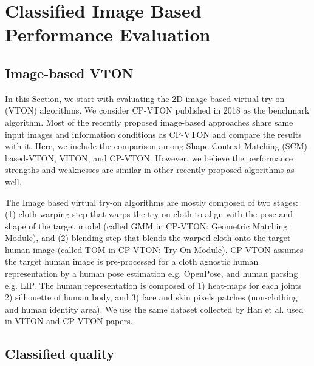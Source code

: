 \section{Classified Image Based Performance Evaluation}

\subsection{Image-based VTON}

In this Section, we start with evaluating the 2D image-based virtual try-on (VTON) algorithms. We consider CP-VTON\cite{Wang2018TowardCI} published in 2018 as the benchmark algorithm. Most of the recently proposed image-based approaches\cite{Han2017VITONAI,Sun2019ImageBasedVT,Yu_2019_ICCV} share same input images and information conditions as CP-VTON and compare the results with it. Here, we include the comparison among Shape-Context Matching (SCM) based-VTON, VITON\cite{Han2017VITONAI}, and  CP-VTON\cite{Wang2018TowardCI}. However, we believe the performance strengths and weaknesses are similar in other recently proposed algorithms as well.


The Image based virtual try-on algorithms are mostly composed of two stages: (1) cloth warping step that warps the try-on cloth to align with the pose and shape of the target model (called GMM in CP-VTON: Geometric Matching Module)\cite{Wang2018TowardCI}, and (2) blending step that blends the warped cloth onto the target human image (called TOM in CP-VTON: Try-On Module)\cite{Wang2018TowardCI}. CP-VTON\cite{Wang2018TowardCI} assumes the target human image is pre-processed for a cloth agnostic human representation by a human pose estimation e.g. OpenPose\cite{Cao2018OpenPoseRM}, and human parsing e.g. LIP\cite{Liang2018LookIP}. The human representation is composed of 1) heat-maps for each joints 2) silhouette of human body, and 3) face and skin pixels patches (non-clothing and human identity area). We use the same dataset collected by Han et al. used in VITON\cite{Han2017VITONAI} and CP-VTON\cite{Wang2018TowardCI} papers.


\subsection{Classified quality}

